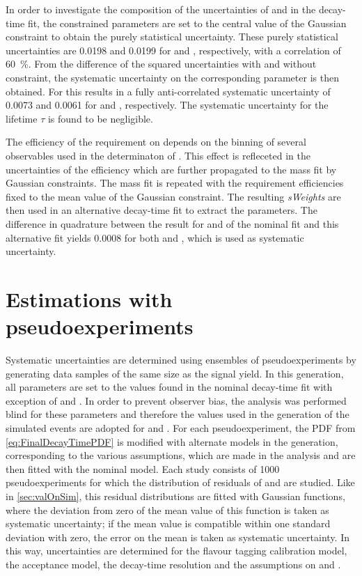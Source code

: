 In order to investigate the composition of the uncertainties of \Sf and \Sfbar in the decay-time fit, the constrained parameters are set to the central value of the Gaussian constraint to obtain the purely statistical uncertainty.
These purely statistical uncertainties are \num{0.0198} and \num{0.0199} for \Sf and \Sfbar, respectively, with a correlation of \SI{60}{\percent}.
From the difference of the squared uncertainties with and without constraint, the systematic uncertainty on the corresponding parameter is then obtained.
For \dm this results in a fully anti-correlated systematic uncertainty of \num{0.0073} and \num{0.0061} for \Sf and \Sfbar, respectively.
The systematic uncertainty for the \Bz lifetime $\tau$ is found to be negligible.

The efficiency of the requirement on \dllkpi depends on the binning of several observables used in the determinaton of \dllkpi.
This effect is refleceted in the uncertainties of the efficiency which are further propagated to the mass fit by Gaussian constraints.
The mass fit is repeated with the \dllkpi requirement efficiencies fixed to the mean value of the Gaussian constraint.
The resulting \emph{sWeights} are then used in an alternative decay-time fit to extract the \CP parameters.
The difference in quadrature between the result for \Sf and \Sfbar of the nominal fit and this alternative fit yields \num{0.0008} for both \Sf and \Sfbar, which is used as systematic uncertainty.

\section{Estimations with pseudoexperiments}
\label{sec:systUncertsPseudo}

Systematic uncertainties are determined using ensembles of pseudoexperiments by generating data samples of the same size as the \BdToDpi signal yield.
In this generation, all parameters are set to the values found in the nominal decay-time fit with exception of \Sf and \Sfbar.
In order to prevent observer bias, the analysis was performed blind for these parameters and therefore the values used in the generation of the simulated events are adopted for \Sf and \Sfbar.
For each pseudoexperiment, the PDF from \cref{eq:FinalDecayTimePDF} is modified with alternate models in the generation, corresponding to the various assumptions, which are made in the analysis and are then fitted with the nominal model.
Each study consists of \num{1000} pseudoexperiments for which the distribution of residuals of \Sf and \Sfbar are studied.
Like in \cref{sec:valOnSim}, this residual distributions are fitted with Gaussian functions, where the deviation from zero of the mean value of this function is taken as systematic uncertainty; if the mean value is compatible within one standard deviation with zero, the error on the mean is taken as systematic uncertainty.
In this way, uncertainties are determined for the flavour tagging calibration model, the acceptance model, the decay-time resolution and the assumptions on \DG and \Cf.

